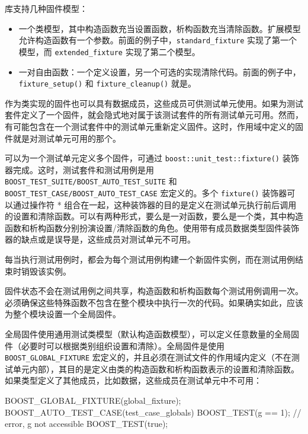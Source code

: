 
库支持几种固件模型：

\begin{itemize}
\item
一个类模型，其中构造函数充当设置函数，析构函数充当清除函数。扩展模型允许构造函数有一个参数。前面的例子中，\verb|standard_fixture| 实现了第一个模型，而 \verb|extended_fixture| 实现了第二个模型。

\item
一对自由函数：一个定义设置，另一个可选的实现清除代码。前面的例子中， \verb|fixture_setup()| 和 \verb|fixture_cleanup()| 就是。
\end{itemize}

作为类实现的固件也可以具有数据成员，这些成员可供测试单元使用。如果为测试套件定义了一个固件，就会隐式地对属于该测试套件的所有测试单元可用。然而，有可能包含在一个测试套件中的测试单元重新定义固件。这时，作用域中定义的固件就是对测试单元可用的那个。

可以为一个测试单元定义多个固件，可通过 \verb|boost::unit_test::fixture()| 装饰器完成。这时，测试套件和测试用例是用 \verb|BOOST_TEST_SUITE/BOOST_AUTO_TEST_SUITE| 和 \verb|BOOST_TEST_CASE/BOOST_AUTO_TEST_CASE| 宏定义的。多个 \verb|fixture()| 装饰器可以通过操作符 * 组合在一起，这种装饰器的目的是定义在测试单元执行前后调用的设置和清除函数。可以有两种形式，要么是一对函数，要么是一个类，其中构造函数和析构函数分别扮演设置/清除函数的角色。使用带有成员数据类型固件装饰器的缺点或是误导是，这些成员对测试单元不可用。

每当执行测试用例时，都会为每个测试用例构建一个新固件实例，而在测试用例结束时销毁该实例。

\begin{myNotic}
固件状态不会在测试用例之间共享，构造函数和析构函数每个测试用例调用一次。必须确保这些特殊函数不包含在整个模块中执行一次的代码。如果确实如此，应该为整个模块设置一个全局固件。
\end{myNotic}

全局固件使用通用测试类模型（默认构造函数模型），可以定义任意数量的全局固件（必要时可以根据类别组织设置和清除）。全局固件是使用 \verb|BOOST_GLOBAL_FIXTURE| 宏定义的，并且必须在测试文件的作用域内定义（不在测试单元内部），其目的是定义由类的构造函数和析构函数表示的设置和清除函数。如果类型定义了其他成员，比如数据，这些成员在测试单元中不可用：

\begin{cpp}
BOOST_GLOBAL_FIXTURE(global_fixture);
BOOST_AUTO_TEST_CASE(test_case_globals)
{
    BOOST_TEST(g == 1); // error, g not accessible
    BOOST_TEST(true);
}
\end{cpp}

